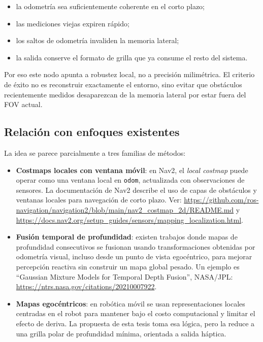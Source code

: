 \begin{itemize}
  \item la odometría sea suficientemente coherente en el corto plazo;
  \item las mediciones viejas expiren rápido;
  \item los saltos de odometría invaliden la memoria lateral;
  \item la salida conserve el formato de grilla que ya consume el resto del sistema.
\end{itemize}

Por eso este nodo apunta a robustez local, no a precisión milimétrica. El criterio de éxito
no es reconstruir exactamente el entorno, sino evitar que obstáculos recientemente medidos
desaparezcan de la memoria lateral por estar fuera del FOV actual.

\subsection{Relación con enfoques existentes}

La idea se parece parcialmente a tres familias de métodos:

\begin{itemize}
  \item \textbf{Costmaps locales con ventana móvil}: en Nav2, el \textit{local costmap}
  puede operar como una ventana local en \texttt{odom}, actualizada con observaciones de
  sensores. La documentación de Nav2 describe el uso de capas de obstáculos y ventanas
  locales para navegación de corto plazo. Ver:
  \url{https://github.com/ros-navigation/navigation2/blob/main/nav2_costmap_2d/README.md}
  y \url{https://docs.nav2.org/setup_guides/sensors/mapping_localization.html}.

  \item \textbf{Fusión temporal de profundidad}: existen trabajos donde mapas de
  profundidad consecutivos se fusionan usando transformaciones obtenidas por odometría
  visual, incluso desde un punto de vista egocéntrico, para mejorar percepción reactiva
  sin construir un mapa global pesado. Un ejemplo es ``Gaussian Mixture Models for
  Temporal Depth Fusion'', NASA/JPL:
  \url{https://ntrs.nasa.gov/citations/20210007922}.

  \item \textbf{Mapas egocéntricos}: en robótica móvil se usan representaciones locales
  centradas en el robot para mantener bajo el costo computacional y limitar el efecto de
  deriva. La propuesta de esta tesis toma esa lógica, pero la reduce a una grilla polar
  de profundidad mínima, orientada a salida háptica.
\end{itemize}

